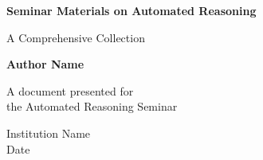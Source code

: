 \begin{titlepage}
    \centering
    \vspace*{1cm}
    
    \Huge\textbf{Seminar Materials on Automated Reasoning}
    
    \vspace{0.5cm}
    \LARGE{A Comprehensive Collection}
    
    \vspace{1.5cm}
    \textbf{Author Name}
    
    \vfill
    
    A document presented for\\
    the Automated Reasoning Seminar
    
    \vspace{0.8cm}
    
    \Large{Institution Name}\\
    Date
    
\end{titlepage}

